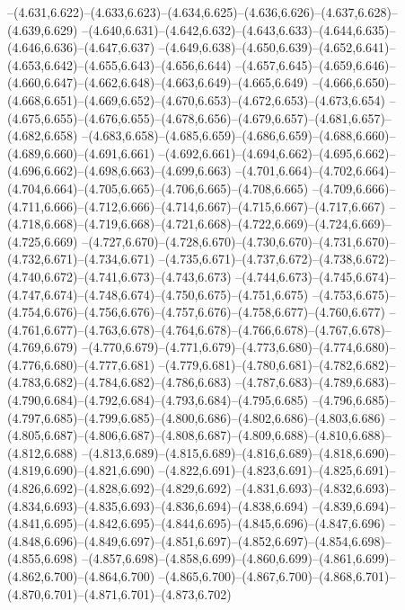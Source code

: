   --(4.631,6.622)--(4.633,6.623)--(4.634,6.625)--(4.636,6.626)--(4.637,6.628)--(4.639,6.629)%
  --(4.640,6.631)--(4.642,6.632)--(4.643,6.633)--(4.644,6.635)--(4.646,6.636)--(4.647,6.637)%
  --(4.649,6.638)--(4.650,6.639)--(4.652,6.641)--(4.653,6.642)--(4.655,6.643)--(4.656,6.644)%
  --(4.657,6.645)--(4.659,6.646)--(4.660,6.647)--(4.662,6.648)--(4.663,6.649)--(4.665,6.649)%
  --(4.666,6.650)--(4.668,6.651)--(4.669,6.652)--(4.670,6.653)--(4.672,6.653)--(4.673,6.654)%
  --(4.675,6.655)--(4.676,6.655)--(4.678,6.656)--(4.679,6.657)--(4.681,6.657)--(4.682,6.658)%
  --(4.683,6.658)--(4.685,6.659)--(4.686,6.659)--(4.688,6.660)--(4.689,6.660)--(4.691,6.661)%
  --(4.692,6.661)--(4.694,6.662)--(4.695,6.662)--(4.696,6.662)--(4.698,6.663)--(4.699,6.663)%
  --(4.701,6.664)--(4.702,6.664)--(4.704,6.664)--(4.705,6.665)--(4.706,6.665)--(4.708,6.665)%
  --(4.709,6.666)--(4.711,6.666)--(4.712,6.666)--(4.714,6.667)--(4.715,6.667)--(4.717,6.667)%
  --(4.718,6.668)--(4.719,6.668)--(4.721,6.668)--(4.722,6.669)--(4.724,6.669)--(4.725,6.669)%
  --(4.727,6.670)--(4.728,6.670)--(4.730,6.670)--(4.731,6.670)--(4.732,6.671)--(4.734,6.671)%
  --(4.735,6.671)--(4.737,6.672)--(4.738,6.672)--(4.740,6.672)--(4.741,6.673)--(4.743,6.673)%
  --(4.744,6.673)--(4.745,6.674)--(4.747,6.674)--(4.748,6.674)--(4.750,6.675)--(4.751,6.675)%
  --(4.753,6.675)--(4.754,6.676)--(4.756,6.676)--(4.757,6.676)--(4.758,6.677)--(4.760,6.677)%
  --(4.761,6.677)--(4.763,6.678)--(4.764,6.678)--(4.766,6.678)--(4.767,6.678)--(4.769,6.679)%
  --(4.770,6.679)--(4.771,6.679)--(4.773,6.680)--(4.774,6.680)--(4.776,6.680)--(4.777,6.681)%
  --(4.779,6.681)--(4.780,6.681)--(4.782,6.682)--(4.783,6.682)--(4.784,6.682)--(4.786,6.683)%
  --(4.787,6.683)--(4.789,6.683)--(4.790,6.684)--(4.792,6.684)--(4.793,6.684)--(4.795,6.685)%
  --(4.796,6.685)--(4.797,6.685)--(4.799,6.685)--(4.800,6.686)--(4.802,6.686)--(4.803,6.686)%
  --(4.805,6.687)--(4.806,6.687)--(4.808,6.687)--(4.809,6.688)--(4.810,6.688)--(4.812,6.688)%
  --(4.813,6.689)--(4.815,6.689)--(4.816,6.689)--(4.818,6.690)--(4.819,6.690)--(4.821,6.690)%
  --(4.822,6.691)--(4.823,6.691)--(4.825,6.691)--(4.826,6.692)--(4.828,6.692)--(4.829,6.692)%
  --(4.831,6.693)--(4.832,6.693)--(4.834,6.693)--(4.835,6.693)--(4.836,6.694)--(4.838,6.694)%
  --(4.839,6.694)--(4.841,6.695)--(4.842,6.695)--(4.844,6.695)--(4.845,6.696)--(4.847,6.696)%
  --(4.848,6.696)--(4.849,6.697)--(4.851,6.697)--(4.852,6.697)--(4.854,6.698)--(4.855,6.698)%
  --(4.857,6.698)--(4.858,6.699)--(4.860,6.699)--(4.861,6.699)--(4.862,6.700)--(4.864,6.700)%
  --(4.865,6.700)--(4.867,6.700)--(4.868,6.701)--(4.870,6.701)--(4.871,6.701)--(4.873,6.702)%
